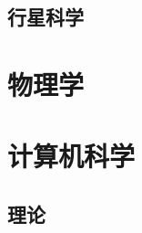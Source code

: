 \documentclass[UTF8]{NatureUniverse}
\begin{document}
\section{行星科学}



\chapter{物理学}    %








\chapter{计算机科学}


\section{理论}
\end{document}
